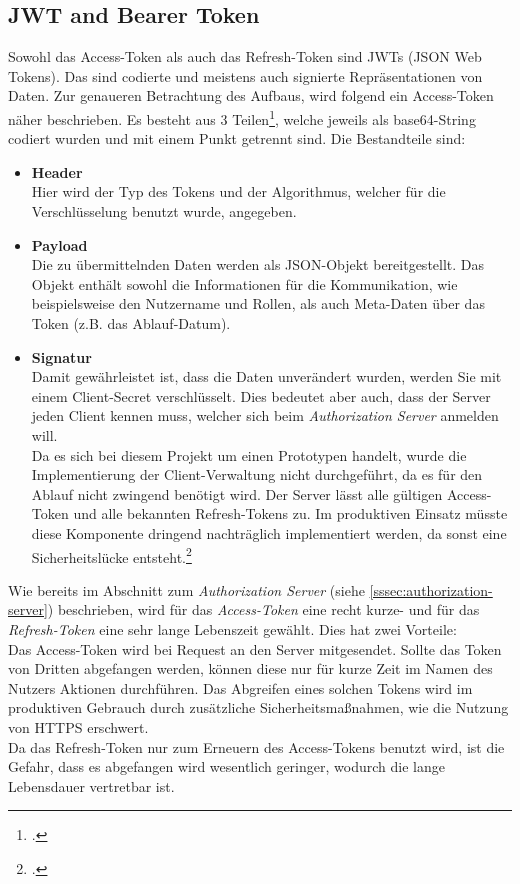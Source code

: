 \subsection{JWT and Bearer Token}
\label{ssec:jwt-bearer}
Sowohl das Access-Token als auch das Refresh-Token sind JWTs (JSON Web Tokens). Das sind codierte und meistens auch signierte Repräsentationen von Daten. Zur genaueren Betrachtung des Aufbaus, wird folgend ein Access-Token näher beschrieben. Es besteht aus 3 Teilen\footcite[S. 289]{book:AngularJs:Steyer2015}, welche jeweils als \ac{base64}-String codiert wurden und mit einem Punkt getrennt sind. Die Bestandteile sind:
\begin{itemize}
\item \textbf{Header}\\Hier wird der Typ des Tokens und der Algorithmus, welcher für die Verschlüsselung benutzt wurde, angegeben. 
\item \textbf{Payload} \\Die zu übermittelnden Daten werden als JSON-Objekt bereitgestellt. Das Objekt enthält sowohl die Informationen für die Kommunikation, wie beispielsweise den Nutzername und Rollen, als auch Meta-Daten über das Token (z.B. das Ablauf-Datum).
\item \textbf{Signatur}\\Damit gewährleistet ist, dass die Daten unverändert wurden, werden Sie mit einem Client-Secret verschlüsselt. Dies bedeutet aber auch, dass der Server jeden Client kennen muss, welcher sich beim \textit{Authorization Server} anmelden will. \\Da es sich bei diesem Projekt um einen Prototypen handelt, wurde die Implementierung der Client-Verwaltung nicht durchgeführt, da es für den Ablauf nicht zwingend benötigt wird. Der Server lässt alle gültigen Access-Token und alle bekannten Refresh-Tokens zu. Im produktiven Einsatz müsste diese Komponente dringend nachträglich implementiert werden, da sonst eine Sicherheitslücke entsteht.\footcite{online:understanding-jwt}
\end{itemize}
Wie bereits im Abschnitt zum \textit{Authorization Server} (siehe \ref{sssec:authorization-server}) beschrieben, wird für das \textit{Access-Token} eine recht kurze- und für das \textit{Refresh-Token} eine sehr lange Lebenszeit gewählt. Dies hat zwei Vorteile:\\
Das Access-Token wird bei Request an den Server mitgesendet. Sollte das Token von Dritten abgefangen werden, können diese nur für kurze Zeit im Namen des Nutzers Aktionen durchführen. Das Abgreifen eines solchen Tokens wird im produktiven Gebrauch durch zusätzliche Sicherheitsmaßnahmen, wie die Nutzung von \ac{HTTPS} erschwert. \\Da das Refresh-Token nur zum Erneuern des Access-Tokens benutzt wird, ist die Gefahr, dass es abgefangen wird wesentlich geringer, wodurch die lange Lebensdauer vertretbar ist. \\
